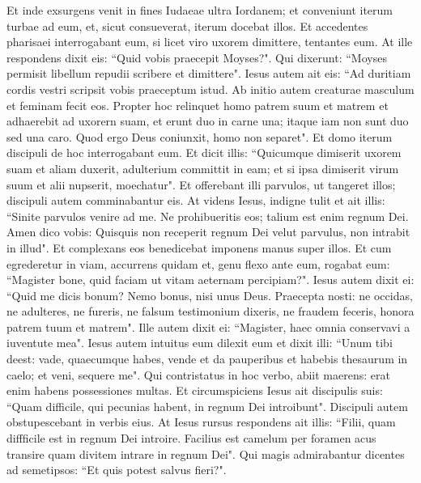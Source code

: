 \begin{biblechapter}  
\verse Et inde exsurgens venit in fines Iudaeae ultra Iordanem; et conveniunt iterum turbae ad eum, et, sicut consueverat, iterum docebat illos. 
\verse Et accedentes pharisaei interrogabant eum, si licet viro uxorem dimittere, tentantes eum. 
\verse At ille respondens dixit eis: “Quid vobis praecepit Moyses?". 
\verse Qui dixerunt: “Moyses permisit libellum repudii scribere et dimittere". 
\verse Iesus autem ait eis: “Ad duritiam cordis vestri scripsit vobis praeceptum istud. 
\verse Ab initio autem creaturae masculum et feminam fecit eos. 
\verse Propter hoc relinquet homo patrem suum et matrem et adhaerebit ad uxorern suam, 
\verse et erunt duo in carne una; itaque iam non sunt duo sed una caro. 
\verse Quod ergo Deus coniunxit, homo non separet". 
\verse Et domo iterum discipuli de hoc interrogabant eum. 
\verse Et dicit illis: “Quicumque dimiserit uxorem suam et aliam duxerit, adulterium committit in eam; 
\verse et si ipsa dimiserit virum suum et alii nupserit, moechatur". 
\verse Et offerebant illi parvulos, ut tangeret illos; discipuli autem comminabantur eis. 
\verse At videns Iesus, indigne tulit et ait illis: “Sinite parvulos venire ad me. Ne prohibueritis eos; talium est enim regnum Dei. 
\verse Amen dico vobis: Quisquis non receperit regnum Dei velut parvulus, non intrabit in illud". 
\verse Et complexans eos benedicebat imponens manus super illos. 
\verse Et cum egrederetur in viam, accurrens quidam et, genu flexo ante eum, rogabat eum: “Magister bone, quid faciam ut vitam aeternam percipiam?". 
\verse Iesus autem dixit ei: “Quid me dicis bonum? Nemo bonus, nisi unus Deus. 
\verse Praecepta nosti: ne occidas, ne adulteres, ne fureris, ne falsum testimonium dixeris, ne fraudem feceris, honora patrem tuum et matrem". 
\verse Ille autem dixit ei: “Magister, haec omnia conservavi a iuventute mea". 
\verse Iesus autem intuitus eum dilexit eum et dixit illi: “Unum tibi deest: vade, quaecumque habes, vende et da pauperibus et habebis thesaurum in caelo; et veni, sequere me". 
\verse Qui contristatus in hoc verbo, abiit maerens: erat enim habens possessiones multas. 
\verse Et circumspiciens Iesus ait discipulis suis: “Quam difficile, qui pecunias habent, in regnum Dei introibunt". 
\verse Discipuli autem obstupescebant in verbis eius. At Iesus rursus respondens ait illis: “Filii, quam diffficile est in regnum Dei introire. 
\verse Facilius est camelum per foramen acus transire quam divitem intrare in regnum Dei". 
\verse Qui magis admirabantur dicentes ad semetipsos: “Et quis potest salvus fieri?". 

\end{biblechapter}
